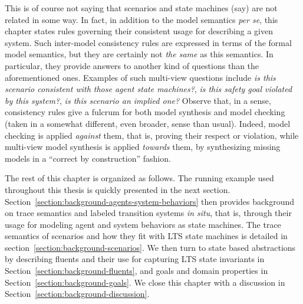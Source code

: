 This is of course not saying that scenarios and state machines (say) are not related in some way. In fact, in addition to the model semantics \emph{per se}, this chapter states rules governing their consistent usage for describing a given system. Such inter-model consistency rules are expressed in terms of the formal model semantics, but they are certainly not \emph{the same} as this semantics. In particular, they provide answers to another kind of questions than the aforementioned ones. Examples of such multi-view questions include \emph{is this scenario consistent with those agent state machines?}, \emph{is this safety goal violated by this system?}, \emph{is this scenario an implied one?} Observe that, in a sense, consistency rules give a fulcrum for both model synthesis and model checking (taken in a somewhat different, even broader, sense than usual). Indeed, model checking is applied \emph{against} them, that is, proving their respect or violation, while multi-view model synthesis is applied \emph{towards} them, by synthesizing missing models in a ``correct by construction'' fashion.

The rest of this chapter is organized as follows. The running example used throughout this thesis is quickly presented in the next section. Section~\ref{section:background-agents-system-behaviors} then provides background on trace semantics and labeled transition systems \emph{in situ}, that is, through their usage for modeling agent and system behaviors as state machines. The trace semantics of scenarios and how they fit with LTS state machines is detailed in section~\ref{section:background-scenarios}. We then turn to state based abstractions by describing fluents and their use for capturing LTS state invariants in Section~\ref{section:background-fluents}, and goals and domain properties in Section~\ref{section:background-goals}. We close this chapter with a discussion in Section~\ref{section:background-discussion}. 








